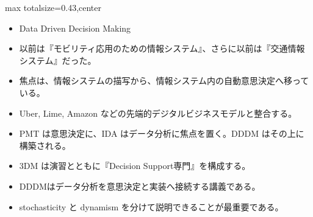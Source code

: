 \clearpage
{}
\begin{minipage}[t]{0.405\textwidth}
\begin{adjustbox}{max totalsize={\textwidth}{0.43\textheight},center}
\begin{minipage}{\textwidth}\scriptsize
{}\begin{itemize}
\item Data Driven Decision Making
\item 以前は『モビリティ応用のための情報システム』、さらに以前は『交通情報システム』だった。
\item 焦点は、情報システムの描写から、情報システム内の自動意思決定へ移っている。
\item Uber, Lime, Amazon などの先端的デジタルビジネスモデルと整合する。
\item PMT は意思決定に、IDA はデータ分析に焦点を置く。DDDM はその上に構築される。
\item 3DM は演習とともに『Decision Support専門』を構成する。
\end{itemize}\begin{itemize}
\item DDDMはデータ分析を意思決定と実装へ接続する講義である。
\item stochasticity と dynamism を分けて説明できることが最重要である。
\end{itemize}
\end{minipage}
\end{adjustbox}
\end{minipage}\hfill

